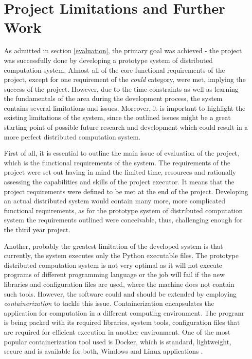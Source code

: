 \documentclass[10pt]{report}
\begin{document}
\section{Project Limitations and Further Work}

As admitted in section \ref{evaluation}, the primary goal was achieved - the project was successfully done by developing a prototype system of distributed computation system. Almost all of the core functional requirements of the project, except for one requirement of the \textit{could} category, were met, implying the success of the project. However, due to the time constraints as well as learning the fundamentals of the area during the development process, the system contains several limitations and issues. Moreover, it is important to highlight the existing limitations of the system, since the outlined issues might be a great starting point of possible future research and development which could result in a more perfect distributed computation system.
\newline

First of all, it is essential to outline the main issue of evaluation of the project, which is the functional requirements of the system. The requirements of the project were set out having in mind the limited time, resources and rationally assessing the capabilities and skills of the project executor. It means that the project requirements were defined to be met at the end of the project. Developing an actual distributed system would contain many more, more complicated functional requirements, as for the prototype system of distributed computation system the requirements outlined were conceivable, thus, challenging enough for the third year project.
\newline

Another, probably the greatest limitation of the developed system is that currently, the system executes only the Python executable files. The prototype distributed computation system is not very optimal as it will not execute programs of different programming language or the job will fail if the new libraries and configuration files are used, where the machine does not contain such tools. However, the software could and should be extended by employing \textit{containerization} to tackle this issue. Containerization encapsulates the application for computation in a different computing environment. The program is being packed with its required libraries, system tools, configuration files that are required for efficient execution in another environment. One of the most popular containerization tool used is Docker, which is standard, lightweight, secure and is available for both, Windows and Linux applications \cite{docker}.
\newline
\end{document}
